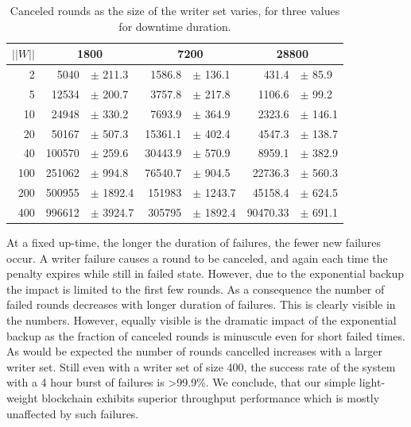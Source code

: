 \documentclass[10pt]{article}
\begin{document}
\begin{table}[b]
\centering
\begin{tabular}{@{}rrlrlrl@{}}
\toprule
\multicolumn{1}{c}{$||W||$} & \multicolumn{2}{c}{1800} & \multicolumn{2}{c}{7200} & \multicolumn{2}{c}{28800} \\
\midrule
2       &  5040   &$\pm$  211.3      & 1586.8  & $\pm$ 136.1    & 431.4    & $\pm$ 85.9              \\
5      & 12534   & $\pm$ 200.7        & 3757.8   & $\pm$ 217.8   & 1106.6      & $\pm$ 99.2     \\
10     & 24948 & $\pm$ 330.2          & 7693.9 & $\pm$ 364.9     & 2323.6   & $\pm$ 146.1 \\
20      & 50167     & $\pm$ 507.3        & 15361.1 & $\pm$ 402.4     & 4547.3  & $\pm$ 138.7 \\
40     & 100570   & $\pm$ 259.6       & 30443.9 & $\pm$ 570.9    & 8959.1      & $\pm$ 382.9         \\
100      & 251062     &  $\pm$ 994.8          & 76540.7   & $\pm$ 904.5   & 22736.3  & $\pm$ 560.3 \\
200     &  500955   &  $\pm$ 1892.4          & 151983 & $\pm$ 1243.7   & 45158.4    & $\pm$ 624.5                    \\ 
400   &  996612   &  $\pm$ 3924.7        & 305795      & $\pm$ 1892.4    & 90470.33      & $\pm$ 691.1                   \\
\bottomrule
\end{tabular}
\caption{Canceled rounds as the size of the writer set varies, for three values for downtime duration.}
\label{table:one}
\end{table}

At a fixed up-time, the longer the duration of failures, the fewer new failures occur. A writer failure causes a round to be canceled, and again each time the penalty expires while still in failed state. However, due to the exponential backup the impact is limited to the first few rounds. As a consequence the number of failed rounds decreases with longer duration of failures. This is clearly visible in the numbers. However, equally visible is the dramatic impact of the exponential backup as the fraction of canceled rounds is minuscule even for short failed times. As would be expected the number of  rounds cancelled increases with a larger writer set. Still even with a writer set of size 400, the success rate of the system with a 4 hour burst of failures is >99.9\%.
We conclude, that our simple light-weight blockchain exhibits superior throughput performance which is mostly unaffected by such failures.
\end{document}

